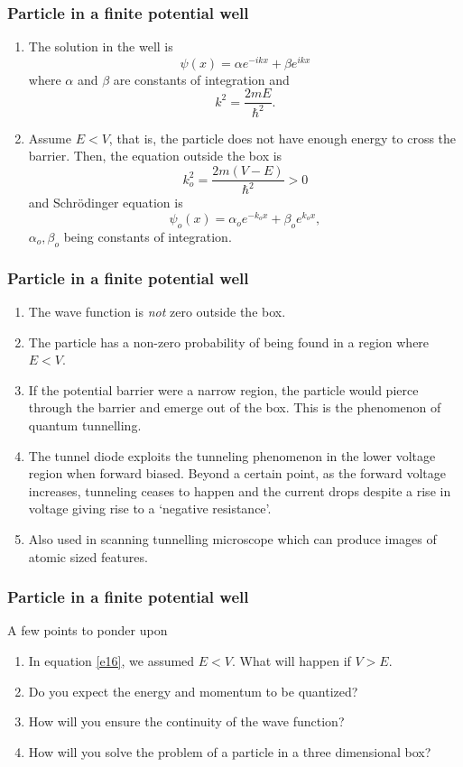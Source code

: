 \documentclass{beamer}
\begin{document}
\begin{frame}
\frametitle{Particle in a finite potential well}
\begin{enumerate}
\item The solution in the well is
\begin{equation}\label{e14}
\psi(x) = \alpha e^{-ikx} + \beta e^{ikx} 
\end{equation}
where $\alpha$ and $\beta$ are constants of integration and 
\begin{equation}\label{e15}
k^2 = \frac{2mE}{\hslash^2}.
\end{equation}
\item Assume $E < V$, that is, the particle does not have enough energy to cross
the barrier. Then, the equation outside the box is
\begin{equation}\label{e16}
k_o^2 = \frac{2m(V - E)}{\hslash^2} > 0
\end{equation}
and Schr\"{o}dinger equation is
\begin{equation}\label{e17}
\psi_o(x) = \alpha_o e^{-k_ox} + \beta_o e^{k_ox},
\end{equation}
$\alpha_o, \beta_o$ being constants of integration.
\end{enumerate}
\end{frame}

\begin{frame}
\frametitle{Particle in a finite potential well}
\begin{enumerate}
\item The wave function is \emph{not} zero outside the box. 
\item The particle has a non-zero probability of being found in a region where
$E < V$.
\item If the potential barrier were a narrow region, the particle would pierce
through the barrier and emerge out of the box. This is the phenomenon of
quantum tunnelling.
\item The tunnel diode exploits the tunneling phenomenon in the lower voltage
region when forward biased. Beyond a certain point, as the forward voltage
increases, tunneling ceases to happen and the current drops despite a rise
in voltage giving rise to a `negative resistance'.
\item Also used in scanning tunnelling microscope which can produce images of
atomic sized features.
\end{enumerate}
\end{frame}

\begin{frame}
\frametitle{Particle in a finite potential well}
A few points to ponder upon
\begin{enumerate}
\item In equation \eqref{e16}, we assumed $E < V$. What will happen if $V > E$.
\item Do you expect the energy and momentum to be quantized?
\item How will you ensure the continuity of the wave function?
\item How will you solve the problem of a particle in a three dimensional box?
\end{enumerate}
\end{frame}
\end{document}
